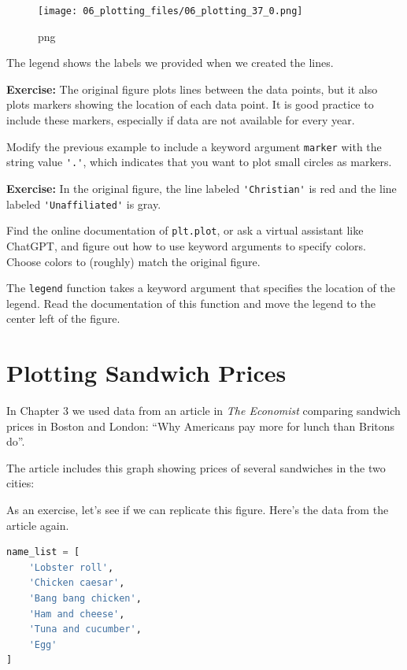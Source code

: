 \documentclass[
]{book}
\newcommand{\passthrough}[1]{#1}
\begin{document}
\begin{figure}
\centering
\texttt{[image: 06\_plotting\_files/06\_plotting\_37\_0.png]}
\caption{png}
\end{figure}

The legend shows the labels we provided when we created the lines.

\textbf{Exercise:} The original figure plots lines between the data
points, but it also plots markers showing the location of each data
point. It is good practice to include these markers, especially if data
are not available for every year.

Modify the previous example to include a keyword argument
\passthrough{\lstinline!marker!} with the string value
\passthrough{\lstinline!'.'!}, which indicates that you want to plot
small circles as markers.

\textbf{Exercise:} In the original figure, the line labeled
\passthrough{\lstinline!'Christian'!} is red and the line labeled
\passthrough{\lstinline!'Unaffiliated'!} is gray.

Find the online documentation of \passthrough{\lstinline!plt.plot!}, or
ask a virtual assistant like ChatGPT, and figure out how to use keyword
arguments to specify colors. Choose colors to (roughly) match the
original figure.

The \passthrough{\lstinline!legend!} function takes a keyword argument
that specifies the location of the legend. Read the documentation of
this function and move the legend to the center left of the figure.

\section{Plotting Sandwich Prices}\label{plotting-sandwich-prices}

In Chapter 3 we used data from an article in \emph{The Economist}
comparing sandwich prices in Boston and London: ``Why Americans pay more
for lunch than Britons do''.

The article includes this graph showing prices of several sandwiches in
the two cities:

As an exercise, let's see if we can replicate this figure. Here's the
data from the article again.

\begin{lstlisting}[language=Python]
name_list = [
    'Lobster roll',
    'Chicken caesar',
    'Bang bang chicken',
    'Ham and cheese',
    'Tuna and cucumber',
    'Egg'
]
\end{lstlisting}
\end{document}
